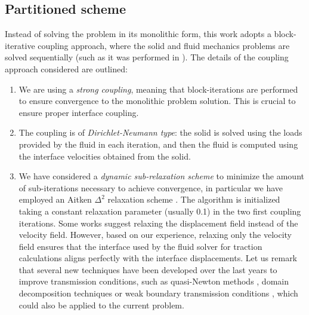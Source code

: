 \documentclass[11pt,english]{article}
\begin{document}
\subsection{Partitioned scheme \label{subsec:iterative_scheme_FSI}}
Instead of solving the problem in its monolithic form, this work adopts a block-iterative coupling approach, where the solid and fluid mechanics problems are solved sequentially (such as it was performed in \cite{MorenoCastanarFSIVisco}).
The details of the coupling approach considered are outlined:

\begin{enumerate}
    \item We are using a \textit{strong coupling}, meaning that block-iterations are performed to ensure convergence to the monolithic problem solution. This is crucial to ensure proper interface coupling.
    \item The coupling is of \textit{Dirichlet-Neumann type}: the solid is solved using the loads provided by the fluid in each iteration, and then the fluid is computed using the interface velocities obtained from the solid.
    \item We have considered a \textit{dynamic sub-relaxation scheme} to minimize the amount of sub-iterations necessary to achieve convergence, in particular we have employed an Aitken  $\Delta^2$ relaxation scheme \cite{kuttler2008fixed}. The algorithm is initialized taking a constant relaxation parameter (usually 0.1) in the two first coupling iterations. Some works suggest relaxing the displacement field instead of the velocity field. However, based on our experience, relaxing only the velocity field ensures that the interface used by the fluid solver for traction calculations aligns perfectly with the interface displacements. Let us remark that several new techniques have been developed over the last years to improve transmission conditions, such as quasi-Newton methods \cite{FSIQN2014,FSIQN2016}, domain decomposition techniques \cite{FSIDDM2015} or weak boundary transmission conditions \cite{FSIWeak2020}, which could also be applied to the current problem.
\end{enumerate}
\end{document}
